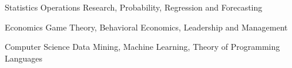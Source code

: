 

\begin{cvskills}

\cvskill
{Statistics} %
{Operations Research, Probability, Regression and Forecasting} %

\cvskill
  {Economics} %
  {Game Theory, Behavioral Economics, Leadership and Management} %

  \cvskill
    {Computer Science} %
    {Data Mining, Machine Learning, Theory of Programming Languages} %

\end{cvskills}
